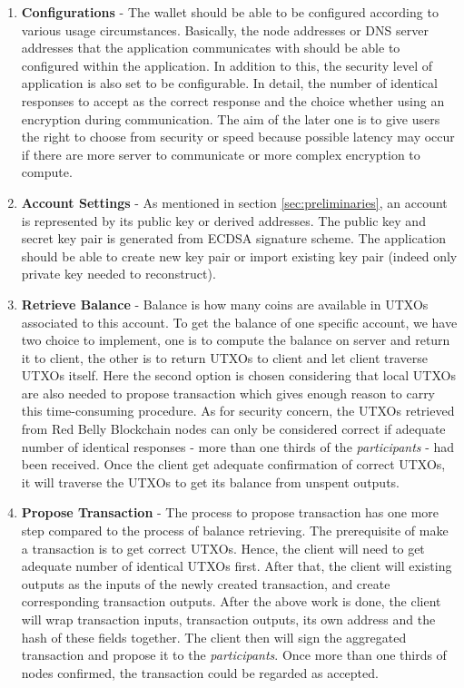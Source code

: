 \documentclass[12pt]{article}
\begin{document}
\begin{enumerate}
   \item \textbf{Configurations} - The wallet should be able to be configured according to various usage circumstances. Basically, the node addresses or DNS server addresses that the application communicates with should be able to configured within the application. In addition to this, the security level of application is also set to be configurable. In detail, the number of identical responses to accept as the correct response and the choice whether using an encryption during communication. The aim of the later one is to give users the right to choose from security or speed because possible latency may occur if there are more server to communicate or more complex encryption to compute.

   \item \textbf{Account Settings} - As mentioned in section \ref{sec:preliminaries}, an account is represented by its public key or derived addresses. The public key and secret key pair is generated from ECDSA signature scheme. The application should be able to create new key pair or import existing key pair (indeed only private key needed to reconstruct).
    
   \item \textbf{Retrieve Balance} - Balance is how many coins are available in UTXOs associated to this account. To get the balance of one specific account, we have two choice to implement, one is to compute the balance on server and return it to client, the other is to return UTXOs to client and let client traverse UTXOs itself. Here the second option is chosen considering that local UTXOs are also needed to propose transaction which gives enough reason to carry this time-consuming procedure. As for security concern, the UTXOs retrieved from Red Belly Blockchain nodes can only be considered correct if adequate number of identical responses - more than one thirds of the \textit{participants} - had been received. Once the client get adequate confirmation of correct UTXOs, it will traverse the UTXOs to get its balance from unspent outputs.

   \item \textbf{Propose Transaction} - The process to propose transaction has one more step compared to the process of balance retrieving. The prerequisite of make a transaction is to get correct UTXOs. Hence, the client will need to get adequate number of identical UTXOs first. After that, the client will existing outputs as the inputs of the newly created transaction, and create corresponding transaction outputs. After the above work is done, the client will wrap transaction inputs, transaction outputs, its own address and the hash of these fields together. The client then will sign the aggregated transaction and propose it to the \textit{participants}. Once more than one thirds of nodes confirmed, the transaction could be regarded as accepted.


\end{enumerate}
\end{document}

